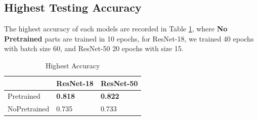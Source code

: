 \documentclass[12pt,a4paper]{article}
\begin{document}
\subsection{Highest Testing Accuracy}
The highest accuracy of each models are recorded in Table \ref{tab:highest}, where \textbf{No Pretrained} parts are trained in 10 epochs, for ResNet-18, we trained 40 epochs with batch size 60, and ResNet-50 20 epochs with size 15.
\begin{table}[hbt]
\centering
\begin{tabular}{|l|l|l|}
\hline
             & ResNet-18 & ResNet-50 \\ \hline
Pretrained   & \textbf{0.818}     & \textbf{0.822}     \\ \hline
NoPretrained & 0.735     & 0.733     \\ \hline
\end{tabular}
\caption{Highest Accuracy}
\label{tab:highest}
\end{table}
\end{document}
